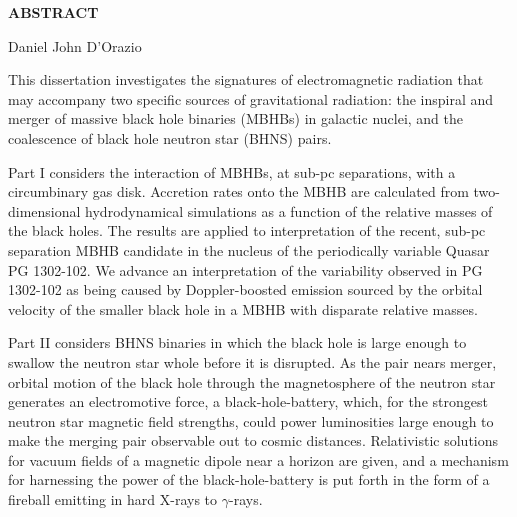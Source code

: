 \thispagestyle{empty}
\begin{center}

{\Large \bf ABSTRACT}

\vspace{.35in}
{\large \bf \thesistitle}

\vspace{.35in}

{\large Daniel John D'Orazio} \\
\vspace{.35in}
\end{center}
%

This dissertation investigates the signatures of electromagnetic radiation
that may accompany two specific sources of gravitational radiation: the
inspiral and merger of massive black hole binaries (MBHBs) in galactic nuclei,
and the coalescence of black hole neutron star (BHNS) pairs.

Part I considers the interaction of MBHBs, at sub-pc separations, with a
circumbinary gas disk. Accretion rates onto the MBHB are calculated from two-dimensional 
hydrodynamical simulations as a function of the relative masses
of the black holes. The results are applied to interpretation of the recent,
sub-pc  separation MBHB candidate in the nucleus of the periodically variable
Quasar PG 1302-102. We advance an interpretation of the variability observed
in PG 1302-102 as being caused by Doppler-boosted emission sourced by the
orbital velocity of the smaller black hole in a MBHB with disparate relative
masses.

Part II considers BHNS binaries in which the black hole is large enough to
swallow the neutron star whole before it is disrupted. As the pair nears
merger, orbital motion of the black hole through the magnetosphere of the
neutron star generates an electromotive force, a black-hole-battery, which,
for the strongest neutron star magnetic field strengths, could power
luminosities large enough to make the merging pair observable out to cosmic
distances. Relativistic solutions for vacuum fields of a magnetic dipole near
a horizon are given, and a mechanism for harnessing the power of the black-hole-battery 
is put forth in the form of a fireball emitting in hard X-rays to
$\gamma$-rays.
